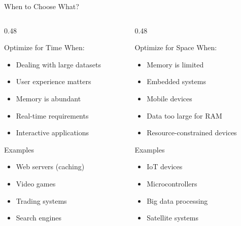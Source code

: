 \documentclass[aspectratio=169,xcolor=dvipsnames]{beamer}
\begin{document}
\begin{frame}{When to Choose What?}
  \begin{columns}
    \begin{column}{0.48\textwidth}
      \begin{block}{Optimize for Time When:}
        \begin{itemize}
          \item Dealing with large datasets
          \item User experience matters
          \item Memory is abundant
          \item Real-time requirements
          \item Interactive applications
        \end{itemize}
      \end{block}

      \vspace{0.3cm}

      \begin{exampleblock}{Examples}
        \begin{itemize}
          \item Web servers (caching)
          \item Video games
          \item Trading systems
          \item Search engines
        \end{itemize}
      \end{exampleblock}
    \end{column}
    \begin{column}{0.48\textwidth}
      \begin{block}{Optimize for Space When:}
        \begin{itemize}
          \item Memory is limited
          \item Embedded systems
          \item Mobile devices
          \item Data too large for RAM
          \item Resource-constrained devices
        \end{itemize}
      \end{block}

      \vspace{0.3cm}

      \begin{exampleblock}{Examples}
        \begin{itemize}
          \item IoT devices
          \item Microcontrollers
          \item Big data processing
          \item Satellite systems
        \end{itemize}
      \end{exampleblock}
    \end{column}
  \end{columns}
\end{frame}
\end{document}
